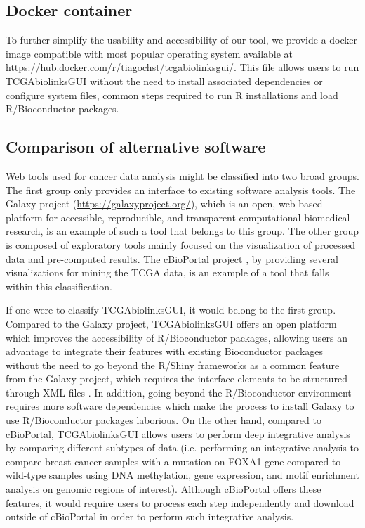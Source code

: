 \subsection{Docker container}
To further simplify the usability and accessibility of our tool, we provide a docker image compatible with most popular operating system available at \\
\href{https://hub.docker.com/r/tiagochst/tcgabiolinksgui/}{https://hub.docker.com/r/tiagochst/tcgabiolinksgui/}. This file allows users to run TCGAbiolinksGUI without the need to install associated dependencies or configure system files, common steps required to run R installations and load R/Bioconductor packages.

\subsection{Comparison of alternative software}

Web tools used for cancer data analysis might be classified into two broad groups.
The first group only provides an interface to existing software analysis tools.
The Galaxy project (\href{https://galaxyproject.org/}{https://galaxyproject.org/}), which is an open, web-based platform for accessible, reproducible, and transparent computational biomedical research, is an example of such a tool that belongs to this group.
The other group is composed of exploratory tools mainly focused on the visualization of processed data and pre-computed results. The cBioPortal project \cite{gao2013integrative,cerami2012cbio}, by providing several visualizations for mining the TCGA data, is an example of a tool that falls within this classification.

 If one were to classify TCGAbiolinksGUI, it would belong to the first group. Compared to the Galaxy project, TCGAbiolinksGUI offers an open platform which improves the accessibility of R/Bioconductor packages, allowing users an advantage to integrate their features with existing Bioconductor packages without the need to go beyond the R/Shiny frameworks as a common feature from the Galaxy project, which requires the interface elements to be structured through XML files \cite{10.12688/f1000research.9821.1}.
In addition, going beyond the R/Bioconductor environment requires more software dependencies which make the process to install Galaxy to use R/Bioconductor packages laborious.
On the other hand, compared to cBioPortal, TCGAbiolinksGUI allows users to perform deep integrative analysis by comparing different subtypes of data (i.e. performing an integrative analysis to compare breast cancer samples with a mutation on FOXA1 gene compared to wild-type samples using DNA methylation, gene expression, and motif enrichment analysis on genomic regions of interest). Although cBioPortal offers these features, it would require users to process each step independently and download outside of cBioPortal in order to perform such integrative analysis.

